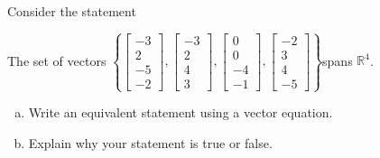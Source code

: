 
\begin{exerciseStatement}


Consider the statement 
\begin{center}\begin{minipage}{0.8\textwidth}
 The set of vectors \( \left\{ \left[\begin{array}{c}
-3 \\
2 \\
-5 \\
-2
\end{array}\right] , \left[\begin{array}{c}
-3 \\
2 \\
4 \\
3
\end{array}\right] , \left[\begin{array}{c}
0 \\
0 \\
-4 \\
-1
\end{array}\right] , \left[\begin{array}{c}
-2 \\
3 \\
4 \\
-5
\end{array}\right] \right\} \)spans \(\mathbb{R}^4\). 
\end{minipage}\end{center}
    


\begin{enumerate}[(a)]
\item  Write an equivalent statement using a vector equation.
\item  Explain why your statement is true or false.
\end{enumerate}
    
\end{exerciseStatement}
    
